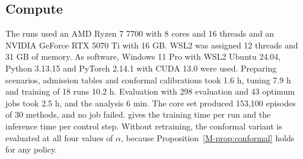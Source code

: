 \subsection{Compute}\label{app:compute}

The runs used an AMD Ryzen 7 7700 with 8 cores and 16 threads and an NVIDIA GeForce RTX 5070 Ti with 16 GB.
WSL2 was assigned 12 threads and 31 GB of memory.
As software, Windows 11 Pro with WSL2 Ubuntu 24.04, Python 3.13.15 and PyTorch 2.14.1 with CUDA 13.0 were used.
Preparing scenarios, admission tables and conformal calibrations took 1.6 h, tuning 7.9 h and training of 18 runs 10.2 h.
Evaluation with 298 evaluation and 43 optimum jobs took 2.5 h, and the analysis 6 min.
The core set produced 153,100 episodes of 30 methods, and no job failed.
 gives the training time per run and the inference time per control step.
Without retraining, the conformal variant is evaluated at all four values of $\alpha$, because Proposition~\ref{M-prop:conformal} holds for any policy.
